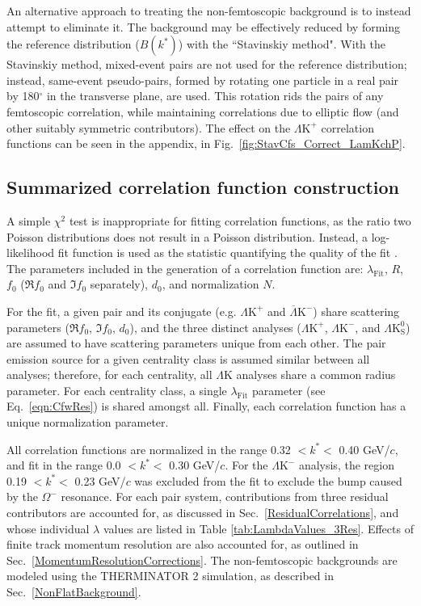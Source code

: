 \documentclass[ALICE,manyauthors]{cernphprep}
\newcommand{\LamK}{$\Lambda$K\xspace}
\newcommand{\LamKchP}{$\Lambda\mathrm{K^{+}}$\xspace}
\newcommand{\ALamKchM}{$\overline{\Lambda}\mathrm{K^{-}}$\xspace}
\newcommand{\LamKchM}{$\Lambda\mathrm{K^{-}}$\xspace}
\newcommand{\LamKs}{$\Lambda\mathrm{K^{0}_{S}}$\xspace}
\begin{document}
An alternative approach to treating the non-femtoscopic background is to instead attempt to eliminate it.
The background may be effectively reduced by forming the reference distribution ($B(k^{*})$) with the ``Stavinskiy method".
With the Stavinskiy method, mixed-event pairs are not used for the reference distribution; instead, same-event pseudo-pairs, formed by rotating one particle in a real pair by 180$^\circ$ in the transverse plane, are used.  
This rotation rids the pairs of any femtoscopic correlation, while maintaining correlations due to elliptic flow (and other suitably symmetric contributors).
The effect on the \LamKchP correlation functions can be seen in the appendix, in Fig.\ \ref{fig:StavCfs_Correct_LamKchP}.


\subsection{Summarized correlation function construction}
\label{SummarizedFitProcedure}


A simple $\chi^{2}$ test is inappropriate for fitting correlation functions, as the ratio two Poisson distributions does not result in a Poisson distribution.
Instead, a log-likelihood fit function is used as the statistic quantifying the quality of the fit \cite{Lisa:2005dd}.
The parameters included in the generation of a correlation function are: $\lambda_{\mathrm{Fit}}$, $R$, $f_{0}$ ($\Re f_{0}$ and $\Im f_{0}$ separately), $d_{0}$, and normalization $N$.

For the fit, a given pair and its conjugate (e.g. \LamKchP and \ALamKchM) share scattering parameters ($\Re f_{0}$, $\Im f_{0}$, $d_{0}$), and the three distinct analyses (\LamKchP, \LamKchM, and \LamKs) are assumed to have scattering parameters unique from each other.
The pair emission source for a given centrality class is assumed similar between all analyses; therefore, for each centrality, all \LamK analyses share a common radius parameter.
For each centrality class, a single $\lambda_{\mathrm{Fit}}$ parameter (see Eq.\ \ref{eqn:CfwRes}) is shared amongst all.
Finally, each correlation function has a unique normalization parameter.

All correlation functions are normalized in the range 0.32 $< k^{*} <$ 0.40 GeV/$c$, and fit in the range 0.0 $< k^{*} <$ 0.30 GeV/$c$.
For the \LamKchM analysis, the region 0.19 $< k^{*} <$ 0.23 GeV/$c$ was excluded from the fit to exclude the bump caused by the $\Omega^{-}$ resonance.
For each pair system, contributions from three residual contributors are accounted for, as discussed in Sec.\ \ref{ResidualCorrelations}, and whose individual $\lambda$ values are listed in Table \ref{tab:LambdaValues_3Res}.
Effects of finite track momentum resolution are also accounted for, as outlined in Sec.\ \ref{MomentumResolutionCorrections}.
The non-femtoscopic backgrounds are modeled using the THERMINATOR 2 simulation, as described in Sec.\ \ref{NonFlatBackground}.
\end{document}
